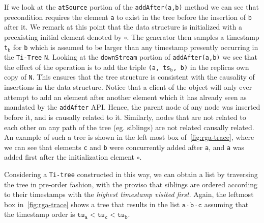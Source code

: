If we look at the \lstinline|atSource| portion of the
\lstinline|addAfter(a,b)| method we can see that precondition requires
the element \lstinline|a| to exist in the tree before the insertion of
\lstinline|b| after it.
%
We remark at this point that the data structure is initialized with a
preexisting initial element denoted by $\circ$.
%
The generator then samples a timestamp \lstinline|t|$_{\mathtt{b}}$
for \lstinline|b| which is assumed to be larger than any
timestamp presently occurring in the \lstinline|Ti-Tree|
\lstinline|N|.
%
Looking at the \lstinline|downStream| portion of
\lstinline|addAfter(a,b)| we see that the effect of the operation is
to add the triple \lstinline|(a, ts|$_{\mathtt{b}}$\lstinline|, b)|
in the replicas own copy of \lstinline|N|.
%
This ensures that the tree structure is consistent with the causality
of insertions in the data structure.
%
Notice that a client of the object will only ever attempt to add an
element after another element which it has already seen as mandated by
the \lstinline|addAfter| API.
%
Hence, the parent node of any node was inserted before it, and is
causally related to it.
%
Similarly, nodes that are not related to each other on any path of
the tree (eg. siblings) are not related causally related.
%
An example of such a tree is shown in the left most box
of~\autoref{fig:rga-trace}, where we can see that 
elements \lstinline|c| and \lstinline|b| were concurrently added after
\lstinline|a|, and \lstinline|a| was added first after the
initialization element $\circ$.

Considering a \lstinline|Ti-tree| constructed in this way, we can
obtain a list by traversing the tree in pre-order fashion, with the
proviso that siblings are ordered according to their timestamps with
the \emph{highest timestamp visited first}.
%
Again, the leftmost box in~\autoref{fig:rga-trace} shows a tree that
results in the list $\mathtt{a \cdot b \cdot c}$ assuming that the
timestamp order is $\mathtt{ts_a < ts_c < ts_b}$.

